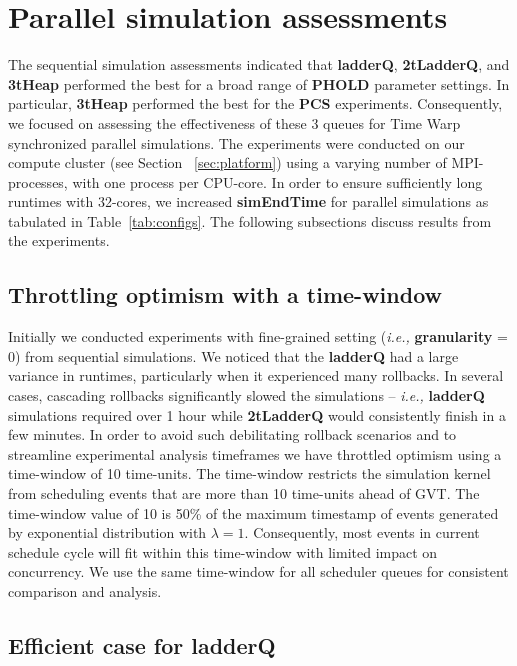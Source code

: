 \section{\textbf{Parallel simulation assessments}}\label{sec:par}

The sequential simulation assessments indicated that \textbf{ladderQ}, \textbf{2tLadderQ}, and \textbf{3tHeap} performed the best for a broad range of \textbf{PHOLD} parameter settings. In particular, \textbf{3tHeap} performed the best for the \textbf{PCS} experiments. Consequently, we focused on assessing the effectiveness of these 3 queues for Time Warp synchronized parallel simulations. The experiments were conducted on our compute cluster (see Section ~\ref{sec:platform}) using a varying number of MPI-processes, with one process per CPU-core. In order to ensure sufficiently long runtimes with 32-cores, we increased \textbf{simEndTime} for parallel simulations as tabulated in Table~\ref{tab:configs}. The following subsections discuss results from the experiments.

\subsection{Throttling optimism with a time-window}

Initially we conducted experiments with fine-grained setting (\textit{i.e.,} \textbf{granularity} = 0) from sequential simulations. We noticed that the \textbf{ladderQ} had a large variance in runtimes, particularly when it experienced many rollbacks. In several cases, cascading rollbacks significantly slowed the simulations -- \textit{i.e.,} \textbf{ladderQ} simulations required over 1 hour while \textbf{2tLadderQ} would consistently finish in a few minutes. In order to avoid such debilitating rollback scenarios and to streamline experimental analysis timeframes we have throttled optimism using a time-window of 10 time-units. The time-window restricts the simulation kernel from scheduling events that are more than 10 time-units ahead of GVT. The time-window value of 10 is 50\% of the maximum timestamp of events generated by exponential distribution with $\lambda=1$. Consequently, most events in current schedule cycle will fit within this time-window with limited impact on concurrency. We use the same time-window for all scheduler queues for consistent comparison and analysis.

\subsection{Efficient case for \textbf{ladderQ}}

